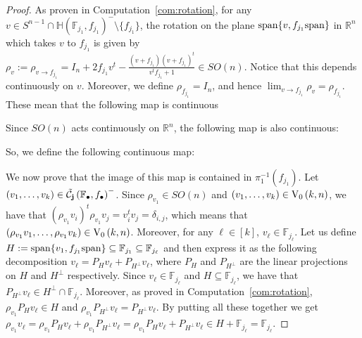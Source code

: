 \begin{proof}
As proven in Computation~\ref{com:rotation}, for any $v\in S^{n-1}\cap\mathbb{H}{\left(\mathbb{F}_{j_1},f_{j_1}\right)}^-\setminus\{f_{j_1}\}$, the rotation on the plane $\mathrm{span}\{v,f_{j_1}\mathrm{span}\}$ in $\mathbb{R}^n$ which takes $v$ to $f_{j_1}$ is given by
$\rho_v:=\rho_{v\to f_{j_1}}=I_n+2f_{j_1}v^t-\frac{(v+f_{j_1})(v+f_{j_1})^t}{v^tf_{j_1}+1}\in SO(n)$.
Notice that this depends continuously on $v$. Moreover, we define $\rho_{f_{j_1}}=I_n$, and hence $\lim_{v\to f_{j_1}}\rho_v=\rho_{f_{j_1}}$. These mean that the following map is continuous
\begin{center}
\end{center}
Since $SO(n)$ acts continuously on $\mathbb{R}^n$, the following map is also continuous:
\begin{center}
\end{center}
So, we define the following continuous map:
\begin{center}
\end{center}
We now prove that the image of this map is contained in $\pi_1^{-1}(f_{j_1})$. Let $(v_1,\ldots,v_k)\in\tilde{\mathcal{C}}_{\mathbf{j}}\left(\mathbb{F}_{\bullet},f_{\bullet}\right)^-$. Since $\rho_{v_1}\in SO(n)$ and $(v_1,\ldots,v_k)\in\StO{k}{n}$, we have that $(\rho_{v_1}v_i)^t\rho_{v_1}v_j=v_i^tv_j=\delta_{i,j}$, which means that $(\rho_{v_1}v_1,\ldots,\rho_{v_1}v_k)\in\StO{k}{n}$. Moreover, for any $\ell\in[k]$, $v_{\ell}\in\mathbb{F}_{j_{\ell}}$. Let us define $H:=\mathrm{span}\{v_1,f_{j_1}\mathrm{span}\}\subseteq\mathbb{F}_{j_1}\subseteq\mathbb{F}_{j_{\ell}}$ and then express it as the following decomposition $v_{\ell}=P_Hv_{\ell}+P_{H^{\perp}}v_{\ell}$, where $P_H$ and $P_{H^{\perp}}$ are the linear projections on $H$ and $H^{\perp}$ respectively. Since $v_{\ell}\in\mathbb{F}_{j_{\ell}}$ and $H\subseteq\mathbb{F}_{j_{\ell}}$, we have that $P_{H^{\perp}}v_{\ell}\in H^{\perp}\cap\mathbb{F}_{j_{\ell}}$. Moreover, as proved in Computation~\ref{com:rotation}, $\rho_{v_1}P_Hv_{\ell}\in H$ and $\rho_{v_1}P_{H^{\perp}}v_{\ell}=P_{H^{\perp}}v_{\ell}$. By putting all these together we get
$\rho_{v_1}v_{\ell}=\rho_{v_1}P_Hv_{\ell}+\rho_{v_1}P_{H^{\perp}}v_{\ell}=\rho_{v_1}P_Hv_{\ell}+P_{H^{\perp}}v_{\ell}\in H+\mathbb{F}_{j_{\ell}}=\mathbb{F}_{j_{\ell}}$.


\end{proof}
